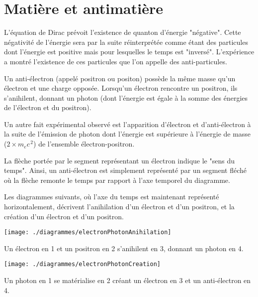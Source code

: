

\section{Matière et antimatière}



L'équation de Dirac prévoit l'existence de quanton d'énergie "négative". Cette négativité de l'énergie sera par la suite réinterprétée comme étant des particules dont l'énergie est positive mais pour lesquelles le temps est "inversé". L'expérience a montré l'existence de ces particules que l'on appelle des anti-particules.

Un anti-électron (appelé positron ou positon) possède la même masse qu'un électron et une charge opposée. Lorsqu'un électron rencontre un positron, ils s'anihilent, donnant un photon (dont l'énergie est égale à la somme des énergies de l'électron et du positron).

Un autre fait expérimental observé est l'apparition d'électron et d'anti-électron à la suite de l'émission de photon dont l'énergie est supérieure à l'énergie de masse ($2\times m_ec^{\,2}$) de l'ensemble électron-positron.

La flèche portée par le segment représentant un électron indique le "sens du temps". Ainsi, un anti-électron est simplement représenté par un segment fléché où la flèche remonte le temps par rapport à l'axe temporel du diagramme.

Les diagrammes suivants, où l'axe du temps est maintenant représenté horizontalement, décrivent l'anihilation d'un électron et d'un positron, et la création d'un électron et d'un positron.

\begin{minipage}[c]{.45\linewidth}
\begin{center}
\texttt{[image: ./diagrammes/electronPhotonAnihilation]}
\end{center}
Un électron en 1 et un positron en 2 s'anihilent en 3, donnant un photon en 4.
\end{minipage}
\hfill
\begin{minipage}[c]{.45\linewidth}
\begin{center}
\texttt{[image: ./diagrammes/electronPhotonCreation]}
\end{center}
Un photon en 1 se matérialise en 2 créant un électron en 3 et un anti-électron en 4.
\end{minipage}

